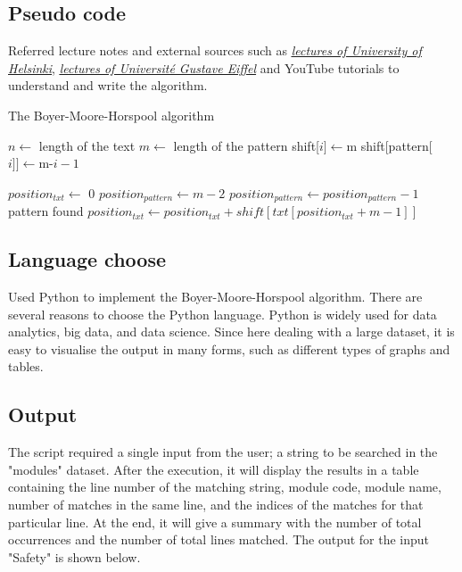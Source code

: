 \documentclass[12pt]{article}
\begin{document}
\subsection{Pseudo code}
Referred lecture notes and external sources such as \textit{\underline{ \href{https://www.cs.helsinki.fi/u/tpkarkka/teach/14-15/SPA/lecture05-2x4.pdf}{lectures of University of Helsinki}}}, \textit{\underline{\href{https://www-igm.univ-mlv.fr/~lecroq/string/node18.html}{lectures of Université Gustave Eiffel}}} and YouTube tutorials to understand and write the algorithm.
\begin{algorithm}
	\caption{The Boyer-Moore-Horspool algorithm}
	\begin{algorithmic}[1]
    	    \State $n \leftarrow$ length of the text
    	    \State $m \leftarrow$ length of the pattern
    		    \State shift[$i]\leftarrow$m
    	    \EndFor
    		    \State shift[pattern[$i]]\leftarrow$m-$i-1$
    	    \EndFor

    	    \State $position_{txt} \leftarrow$ 0
    	            \State $position_{pattern} \leftarrow m -2$
                        \State $position_{pattern} \leftarrow position_{pattern} - 1$
    	                \State pattern found
    	            \EndIf
                    \EndWhile
    	        \EndIf
    	        \State $position_{txt} \leftarrow position_{txt} + shift[txt[position_{txt} + m - 1]]$
    	    \EndWhile
    	\EndFunction
	\end{algorithmic}
\end{algorithm}

\newpage

\subsection{Language choose}
Used Python to implement the Boyer-Moore-Horspool algorithm. There are several reasons to choose the Python language. Python is widely used for data analytics, big data, and data science. Since here dealing with a large dataset, it is easy to visualise the output in many forms, such as different types of graphs and tables.

\subsection{Output}
The script required a single input from the user; a string to be searched in the "modules" dataset. After the execution, it will display the results in a table containing the line number of the matching string, module code, module name, number of matches in the same line, and the indices of the matches for that particular line. At the end, it will give a summary with the number of total occurrences and the number of total lines matched. The output for the input "Safety" is shown below.
\end{document}
